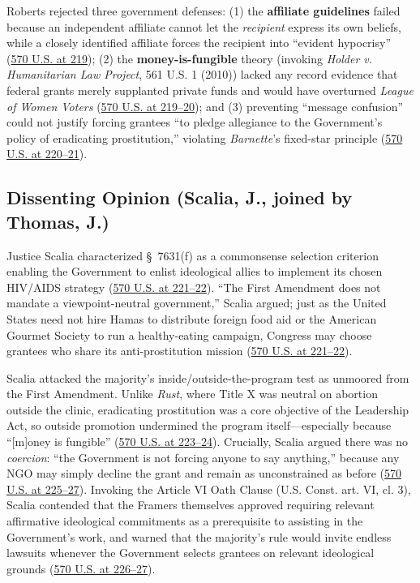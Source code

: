 \documentclass[12pt]{article}
\begin{document}
Roberts rejected three government defenses: (1) the \textbf{affiliate guidelines} failed because an independent affiliate cannot let the \emph{recipient} express its own beliefs, while a closely identified affiliate forces the recipient into ``evident hypocrisy'' (\href{https://supreme.justia.com/cases/federal/us/570/205/}{570 U.S. at 219}); (2) the \textbf{money-is-fungible} theory (invoking \textit{Holder v. Humanitarian Law Project}, 561 U.S. 1 (2010)) lacked any record evidence that federal grants merely supplanted private funds and would have overturned \textit{League of Women Voters} (\href{https://supreme.justia.com/cases/federal/us/570/205/}{570 U.S. at 219--20}); and (3) preventing ``message confusion'' could not justify forcing grantees ``to pledge allegiance to the Government's policy of eradicating prostitution,'' violating \textit{Barnette}'s fixed-star principle (\href{https://supreme.justia.com/cases/federal/us/570/205/}{570 U.S. at 220--21}).

\subsection{Dissenting Opinion (Scalia, J., joined by Thomas, J.)}
Justice Scalia characterized \S~7631(f) as a commonsense selection criterion enabling the Government to enlist ideological allies to implement its chosen HIV/AIDS strategy (\href{https://supreme.justia.com/cases/federal/us/570/205/}{570 U.S. at 221--22}). ``The First Amendment does not mandate a viewpoint-neutral government,'' Scalia argued; just as the United States need not hire Hamas to distribute foreign food aid or the American Gourmet Society to run a healthy-eating campaign, Congress may choose grantees who share its anti-prostitution mission (\href{https://supreme.justia.com/cases/federal/us/570/205/}{570 U.S. at 221--22}).

Scalia attacked the majority's inside/outside-the-program test as unmoored from the First Amendment. Unlike \textit{Rust}, where Title X was neutral on abortion outside the clinic, eradicating prostitution was a core objective of the Leadership Act, so outside promotion undermined the program itself---especially because ``[m]oney is fungible'' (\href{https://supreme.justia.com/cases/federal/us/570/205/}{570 U.S. at 223--24}). Crucially, Scalia argued there was no \emph{coercion}: ``the Government is not forcing anyone to say anything,'' because any NGO may simply decline the grant and remain as unconstrained as before (\href{https://supreme.justia.com/cases/federal/us/570/205/}{570 U.S. at 225--27}). Invoking the Article VI Oath Clause (U.S. Const. art. VI, cl. 3), Scalia contended that the Framers themselves approved requiring relevant affirmative ideological commitments as a prerequisite to assisting in the Government's work, and warned that the majority's rule would invite endless lawsuits whenever the Government selects grantees on relevant ideological grounds (\href{https://supreme.justia.com/cases/federal/us/570/205/}{570 U.S. at 226--27}).
\end{document}

